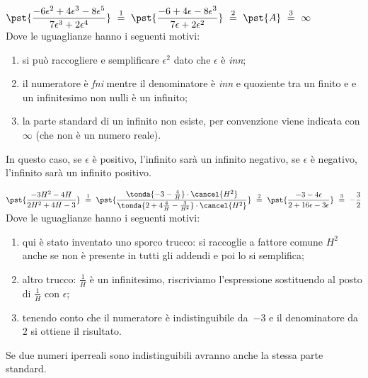 \begin{esempio}
\(\pst{\dfrac{-6\epsilon^2 +4 \epsilon^3 -8 \epsilon^5}
             {7\epsilon^3 + 2 \epsilon^4}} 
~ \stackrel{1}{=} ~
  \pst{\dfrac{-6 +4 \epsilon -8 \epsilon^3}
             {7\epsilon + 2 \epsilon^2}} 
~ \stackrel{2}{=} ~
  \pst{A} 
~ \stackrel{3}{=} ~
  \infty\)\\

Dove le uguaglianze hanno i seguenti motivi:
\begin{enumerate} [nosep]
 \item si può raccogliere e semplificare \(\epsilon^2\) dato che 
 \(\epsilon\) è \emph{inn}; 
 \item il numeratore è \emph{fni} mentre il denominatore è \emph{inn} e  
quoziente tra un finito e e un infinitesimo non nulli è un infinito; 
 \item la parte standard di un infinito non esiste, per convenzione viene 
indicata con  \(\infty\) (che non è un numero reale).
\end{enumerate}
\begin{osservazione}
 In questo caso, se \(\epsilon\) è positivo, l'infinito sarà un infinito 
negativo, se \(\epsilon\) è negativo, l'infinito sarà un infinito positivo.
\end{osservazione}
\end{esempio}

\begin{esempio}
\(\pst{\dfrac{-3H^2 -4H}
             {2H^2 +4H -3}} 
~ \stackrel{1}{=} ~
  \pst{\dfrac{\tonda{-3 -\frac{4}{H}}\cdot \cancel{H^2}}
             {\tonda{2 +4\frac{4}{H} -\frac{3}{H^2}}\cdot \cancel{H^2}}} 
~ \stackrel{2}{=} ~
  \pst{\dfrac{-3 -4 \epsilon}
             {2 +16\epsilon -3 \epsilon}} 
~ \stackrel{3}{=} ~
  -\dfrac{3}{2}\)\\

Dove le uguaglianze hanno i seguenti motivi:
\begin{enumerate} [nosep]
 \item qui è stato inventato uno sporco trucco: si raccoglie 
a fattore comune \(H^2\) anche se non è presente in tutti gli addendi
e poi lo si semplifica; 
 \item altro trucco: \(\frac{1}{H}\) è un infinitesimo, riscriviamo 
l'espressione sostituendo al posto di \(\frac{1}{H}\) con \(\epsilon\); 
 \item tenendo conto che il numeratore è indistinguibile da~\(-3\) e 
il denominatore da \(2\) si ottiene il risultato.
\end{enumerate}
\begin{osservazione}
 Se due numeri iperreali sono indistinguibili avranno anche la stessa parte 
standard.
\end{osservazione}
\end{esempio}


